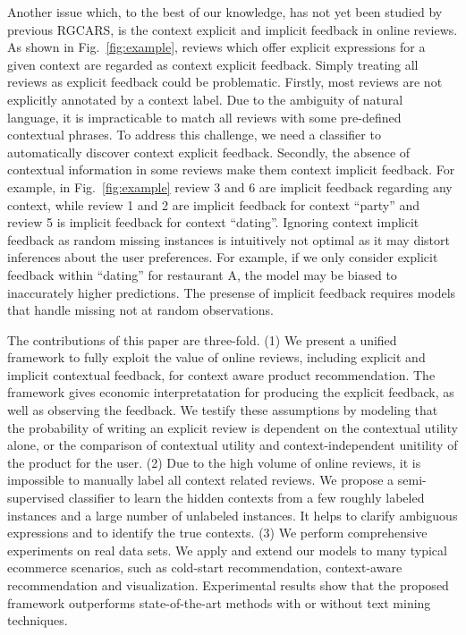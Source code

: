 \documentclass[sigconf]{acmart}
\begin{document}
Another issue which, to the best of our knowledge, has not yet been studied by previous RGCARS, is the context explicit and implicit feedback in online reviews. As shown in Fig.~\ref{fig:example}, reviews which offer explicit expressions for a given context are regarded as context explicit feedback. Simply treating all reviews as explicit feedback could be problematic. Firstly, most reviews are not explicitly annotated by a context label. Due to the ambiguity of natural language, it is impracticable to match all reviews with some pre-defined contextual phrases. To address this challenge, we need a classifier to automatically discover context explicit feedback. Secondly, the absence of contextual information in some reviews make them context implicit feedback.  For example, in Fig.~\ref{fig:example} review 3 and 6 are implicit feedback regarding any context, while review 1 and 2 are implicit feedback for context ``party'' and review 5 is implicit feedback for context ``dating''. Ignoring context implicit feedback as random missing instances is intuitively not optimal as it may distort inferences about the user preferences. For example, if we only consider explicit feedback within ``dating'' for restaurant A, the model may be biased to inaccurately higher predictions. The presense of implicit feedback requires models that handle missing not at random observations.    

The contributions of this paper are three-fold. (1) We present a unified framework to fully exploit the value of online reviews, including explicit and implicit contextual feedback, for context aware product recommendation. The framework gives economic interpretatation for producing the explicit feedback, as well as observing the feedback. We testify these assumptions by modeling that the probability of writing an explicit review is dependent on the contextual utility alone, or the comparison of contextual utility and context-independent unitility of the product for the user. (2) Due to the high volume of online reviews, it is impossible to manually label all context related reviews. We propose a semi-supervised classifier to learn the hidden contexts from a few roughly labeled instances and a large number of unlabeled instances. It helps to clarify ambiguous expressions and to identify the true contexts. (3) We perform comprehensive experiments on real data sets. We apply and extend our models to many typical ecommerce scenarios, such as cold-start recommendation, context-aware recommendation and visualization. Experimental results show that the proposed framework outperforms state-of-the-art methods with or without text mining techniques. 
\end{document}
